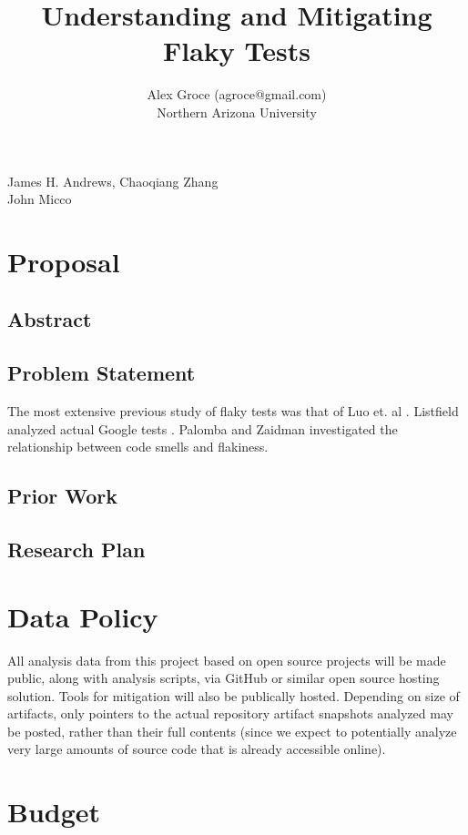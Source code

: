 \documentclass[10pt]{article}
\title{Understanding and Mitigating Flaky Tests}
\author{Alex Groce (agroce@gmail.com)\\Northern Arizona University}
\begin{document}
\maketitle


 James H. Andrews, Chaoqiang Zhang \\
 John Micco
\section{Proposal}

\subsection{Abstract}

\subsection{Problem Statement}

The most extensive previous study of flaky tests was that of Luo et. al \cite{luo2014empirical}.  Listfield analyzed actual Google tests \cite{listfieldtestanalysis}. Palomba and Zaidman \cite{palomba2017does} investigated the relationship between code smells and flakiness.

\subsection{Prior Work}

\subsection{Research Plan}






\section{Data Policy}

All analysis data from this project based on open source projects will be made public, along with analysis scripts, via GitHub or similar open source hosting solution.  Tools for mitigation will also be publically hosted.  Depending on size of artifacts, only pointers to the actual repository artifact snapshots analyzed may be posted, rather than their full contents (since we expect to potentially analyze very large amounts of source code that is already accessible online).

\section{Budget}
\end{document}
